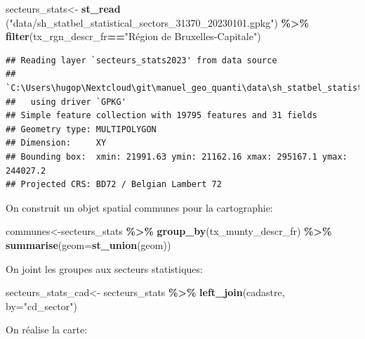 \documentclass[
]{book}
\newenvironment{Shaded}{\begin{snugshade}}{\end{snugshade}}
\newcommand{\AttributeTok}[1]{\textcolor[rgb]{0.13,0.29,0.53}{#1}}
\newcommand{\FunctionTok}[1]{\textcolor[rgb]{0.13,0.29,0.53}{\textbf{#1}}}
\newcommand{\NormalTok}[1]{#1}
\newcommand{\OtherTok}[1]{\textcolor[rgb]{0.56,0.35,0.01}{#1}}
\newcommand{\SpecialCharTok}[1]{\textcolor[rgb]{0.81,0.36,0.00}{\textbf{#1}}}
\newcommand{\StringTok}[1]{\textcolor[rgb]{0.31,0.60,0.02}{#1}}
\begin{document}
\begin{Shaded}
\begin{Highlighting}[]
\NormalTok{secteurs\_stats}\OtherTok{\textless{}{-}} \FunctionTok{st\_read}\NormalTok{ (}\StringTok{"data/sh\_statbel\_statistical\_sectors\_31370\_20230101.gpkg"}\NormalTok{) }\SpecialCharTok{\%\textgreater{}\%}
  \FunctionTok{filter}\NormalTok{(tx\_rgn\_descr\_fr}\SpecialCharTok{==}\StringTok{"Région de Bruxelles{-}Capitale"}\NormalTok{)}
\end{Highlighting}
\end{Shaded}

\begin{verbatim}
## Reading layer `secteurs_stats2023' from data source 
##   `C:\Users\hugop\Nextcloud\git\manuel_geo_quanti\data\sh_statbel_statistical_sectors_31370_20230101.gpkg' 
##   using driver `GPKG'
## Simple feature collection with 19795 features and 31 fields
## Geometry type: MULTIPOLYGON
## Dimension:     XY
## Bounding box:  xmin: 21991.63 ymin: 21162.16 xmax: 295167.1 ymax: 244027.2
## Projected CRS: BD72 / Belgian Lambert 72
\end{verbatim}

On construit un objet spatial communes pour la cartographie:

\begin{Shaded}
\begin{Highlighting}[]
\NormalTok{communes}\OtherTok{\textless{}{-}}\NormalTok{secteurs\_stats }\SpecialCharTok{\%\textgreater{}\%}
  \FunctionTok{group\_by}\NormalTok{(tx\_munty\_descr\_fr) }\SpecialCharTok{\%\textgreater{}\%}
  \FunctionTok{summarise}\NormalTok{(}\AttributeTok{geom=}\FunctionTok{st\_union}\NormalTok{(geom))}
\end{Highlighting}
\end{Shaded}

On joint les groupes aux secteurs statistiques:

\begin{Shaded}
\begin{Highlighting}[]
\NormalTok{secteurs\_stats\_cad}\OtherTok{\textless{}{-}}\NormalTok{ secteurs\_stats  }\SpecialCharTok{\%\textgreater{}\%}
  \FunctionTok{left\_join}\NormalTok{(cadastre, }\AttributeTok{by=}\StringTok{"cd\_sector"}\NormalTok{)}
\end{Highlighting}
\end{Shaded}

On réalise la carte:
\end{document}

